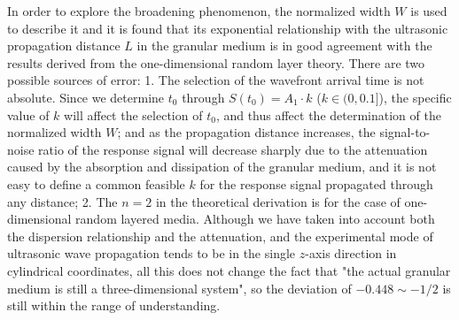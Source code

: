 \begin{digest}
    In order to explore the broadening phenomenon, the normalized width $W$ is used to describe it and it is found that its exponential relationship with the ultrasonic propagation distance $L$ in the granular medium is in good agreement with the results derived from the one-dimensional random layer theory. There are two possible sources of error:
    1. The selection of the wavefront arrival time is not absolute. Since we determine $t_{0}$ through $S(t_{0}) = A_{1}\cdot k$ ($k\in(0,0.1]$), the specific value of $k$ will affect the selection of $t_{0}$, and thus affect the determination of the normalized width $W$; and as the propagation distance increases, the signal-to-noise ratio of the response signal will decrease sharply due to the attenuation caused by the absorption and dissipation of the granular medium, and it is not easy to define a common feasible $k$ for the response signal propagated through any distance;
    2. The $n=2$ in the theoretical derivation is for the case of one-dimensional random layered media. Although we have taken into account both the dispersion relationship and the attenuation, and the experimental mode of ultrasonic wave propagation tends to be in the single $z$-axis direction in cylindrical coordinates, all this does not change the fact that "the actual granular medium is still a three-dimensional system", so the deviation of $-0.448\sim-1/2$ is still within the range of understanding.

    

\end{digest}
